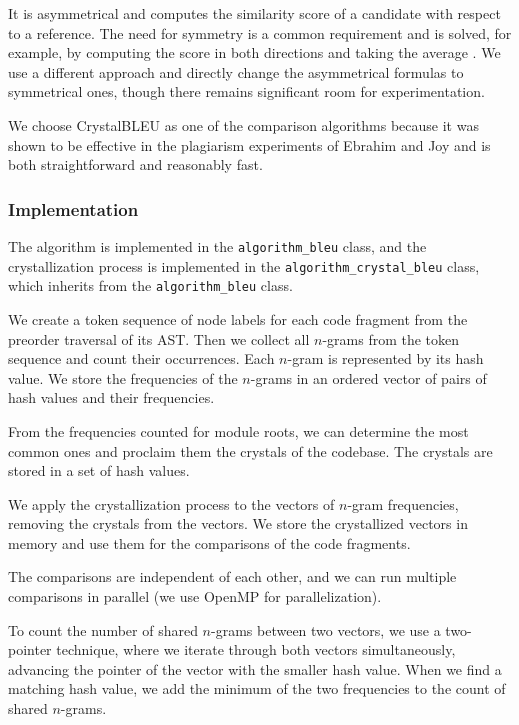 It is asymmetrical and computes the similarity score of a candidate with respect to a reference.
The need for symmetry is a common requirement and is solved, for example, by computing the score in both directions and taking the average \cite{sbleu10}.
We use a different approach and directly change the asymmetrical formulas to symmetrical ones, though there remains significant room for experimentation.

We choose CrystalBLEU as one of the comparison algorithms because it was shown to be effective in the plagiarism experiments of Ebrahim and Joy \cite{ebrahim26} and is both straightforward and reasonably fast.

\subsubsection{Implementation}

The algorithm is implemented in the \texttt{algorithm\_bleu} class, and the crystallization process is implemented in the \texttt{algorithm\_crystal\_bleu} class, which inherits from the \texttt{algorithm\_bleu} class.

We create a token sequence of node labels for each code fragment from the preorder traversal of its AST.
Then we collect all $n$-grams from the token sequence and count their occurrences.
Each $n$-gram is represented by its hash value.
We store the frequencies of the $n$-grams in an ordered vector of pairs of hash values and their frequencies.

From the frequencies counted for module roots, we can determine the most common ones and proclaim them the crystals of the codebase.
The crystals are stored in a set of hash values.

We apply the crystallization process to the vectors of $n$-gram frequencies, removing the crystals from the vectors.
We store the crystallized vectors in memory and use them for the comparisons of the code fragments.

The comparisons are independent of each other, and we can run multiple comparisons in parallel (we use OpenMP \cite{openmp} for parallelization).

To count the number of shared $n$-grams between two vectors, we use a two-pointer technique, where we iterate through both vectors simultaneously, advancing the pointer of the vector with the smaller hash value.
When we find a matching hash value, we add the minimum of the two frequencies to the count of shared $n$-grams.

